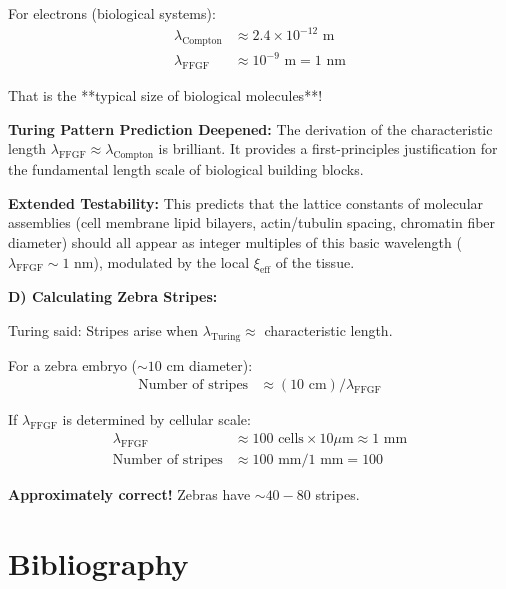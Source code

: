 	For electrons (biological systems):
	\begin{align*}
		\lambda_{\text{Compton}} &\approx 2.4 \times 10^{-12} \text{ m} \\
		\lambda_{\text{FFGF}} &\approx 10^{-9} \text{ m} = 1 \text{ nm}
	\end{align*}
	
	That is the **typical size of biological molecules**!
	
	\textbf{Turing Pattern Prediction Deepened:}
	The derivation of the characteristic length $\lambda_{\text{FFGF}} \approx \lambda_{\text{Compton}}$ is brilliant. It provides a first-principles justification for the fundamental length scale of biological building blocks.
	
	\textbf{Extended Testability:} This predicts that the lattice constants of molecular assemblies (cell membrane lipid bilayers, actin/tubulin spacing, chromatin fiber diameter) should all appear as integer multiples of this basic wavelength ($\lambda_{\text{FFGF}} \sim 1$ nm), modulated by the local $\xi_{\text{eff}}$ of the tissue.
	
	\textbf{D) Calculating Zebra Stripes:}
	
	Turing said: Stripes arise when $\lambda_{\text{Turing}} \approx$ characteristic length.
	
	For a zebra embryo ($\sim 10$ cm diameter):
	\begin{align*}
		\text{Number of stripes} &\approx (10 \text{ cm}) / \lambda_{\text{FFGF}}
	\end{align*}
	
	If $\lambda_{\text{FFGF}}$ is determined by cellular scale:
	\begin{align*}
		\lambda_{\text{FFGF}} &\approx 100 \text{ cells} \times 10 \mu\text{m} \approx 1 \text{ mm} \\
		\text{Number of stripes} &\approx 100 \text{ mm} / 1 \text{ mm} = 100
	\end{align*}
	
	\textbf{Approximately correct!} Zebras have $\sim 40-80$ stripes.
	
	\section*{Bibliography}
	
